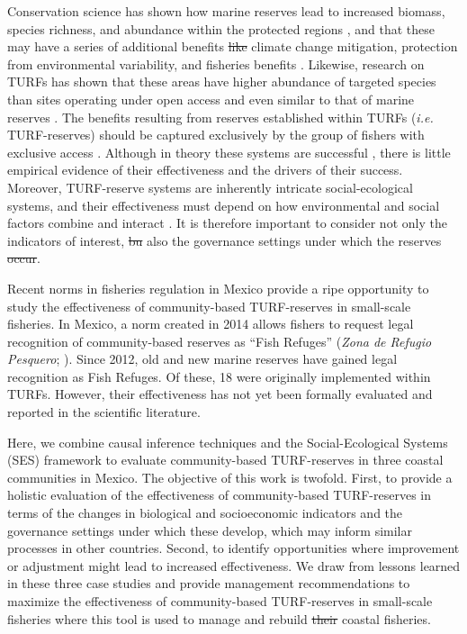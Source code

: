 \documentclass{frontiersSCNS}
\providecommand{\DIFaddtex}[1]{{\protect\color{blue}\uwave{#1}}} %
\providecommand{\DIFdeltex}[1]{{\protect\color{red}\sout{#1}}}                      %
\providecommand{\DIFaddbegin}{} %
\providecommand{\DIFaddend}{} %
\providecommand{\DIFdelbegin}{} %
\providecommand{\DIFdelend}{} %
\providecommand{\DIFadd}[1]{\texorpdfstring{\DIFaddtex{#1}}{#1}} %
\providecommand{\DIFdel}[1]{\texorpdfstring{\DIFdeltex{#1}}{}} %
\begin{document}
Conservation science has shown how marine reserves lead to increased
biomass, species richness, and abundance within the protected regions
\citep{lester_2009}, and that these may have a series of additional
benefits \DIFdelbegin \DIFdel{like }\DIFdelend \DIFaddbegin \DIFadd{such as }\DIFaddend climate change mitigation, protection from
environmental variability, and fisheries benefits
\citep{roberts_2017-J9,micheli_2012-EU,krueck_2017-J1}. Likewise,
research on TURFs has shown that these areas have higher abundance of
targeted species than sites operating under open access and even similar
to that of marine reserves \citep{gelcich_2008,gelcich_2012}. The
benefits resulting from reserves established within TURFs (\emph{i.e.}
TURF-reserves) should be captured exclusively by the group of fishers
with exclusive access \citep{gelcich_2015}. Although in theory these
systems are successful \citep{smallhornwest_2018}, there is little
empirical evidence of their effectiveness and the drivers of their
success. Moreover, TURF-reserve systems are inherently intricate
social-ecological systems, and their effectiveness must depend on how
environmental and social factors combine and interact
\citep{ostrom_2009,gelcich_2015}. It is therefore important to consider
not only the indicators of interest, \DIFdelbegin \DIFdel{bu }\DIFdelend \DIFaddbegin \DIFadd{but }\DIFaddend also the governance settings
under which the reserves \DIFdelbegin \DIFdel{occur}\DIFdelend \DIFaddbegin \DIFadd{operate}\DIFaddend .

Recent norms in fisheries regulation in Mexico provide a ripe
opportunity to study the effectiveness of community-based TURF-reserves
in small-scale fisheries. In Mexico, a norm created in 2014 allows
fishers to request legal recognition of community-based reserves as
``Fish Refuges'' (\emph{Zona de Refugio Pesquero}; \citet{nom}). Since
2012, old and new marine reserves have gained legal recognition as Fish
Refuges. Of these, 18 were originally implemented within TURFs. However,
their effectiveness has not yet been formally evaluated and reported in
the scientific literature.

Here, we combine causal inference techniques and the Social-Ecological
Systems (SES) framework to evaluate community-based TURF-reserves in
three coastal communities in Mexico. The objective of this work is
twofold. First, to provide a holistic evaluation of the effectiveness of
community-based TURF-reserves in terms of the changes in biological and
socioeconomic indicators and the governance settings under which these
develop, which may inform similar processes in other countries. Second,
to identify opportunities where improvement or adjustment might lead to
increased effectiveness. We draw from lessons learned in these three
case studies and provide management recommendations to maximize the
effectiveness of community-based TURF-reserves in small-scale fisheries
where this tool is used to manage and rebuild \DIFdelbegin \DIFdel{their }\DIFdelend coastal fisheries.
\end{document}
